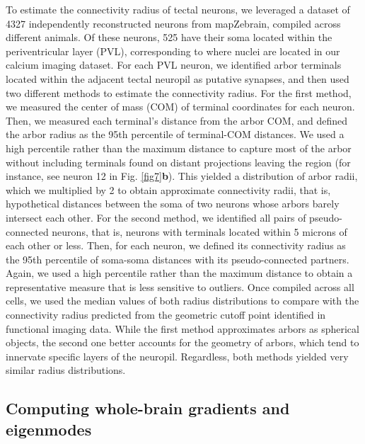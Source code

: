 \documentclass{article}
\begin{document}
To estimate the connectivity radius of tectal neurons, we leveraged a dataset of 4327 independently reconstructed neurons from mapZebrain, compiled across different animals\cite{kunst2019cellular}. Of these neurons, 525 have their soma located within the periventricular layer (PVL), corresponding to where nuclei are located in our calcium imaging dataset. For each PVL neuron, we identified arbor terminals located within the adjacent tectal neuropil as putative synapses, and then used two different methods to estimate the connectivity radius. For the first method, we measured the center of mass (COM) of terminal coordinates for each neuron. Then, we measured each terminal's distance from the arbor COM, and defined the arbor radius as the 95th percentile of terminal-COM distances. We used a high percentile rather than the maximum distance to capture most of the arbor without including terminals found on distant projections leaving the region (for instance, see neuron 12 in Fig. \ref{fig7}\textbf{b}). This yielded a distribution of arbor radii, which we multiplied by 2 to obtain approximate connectivity radii, that is, hypothetical distances between the soma of two neurons whose arbors barely intersect each other. For the second method, we identified all pairs of pseudo-connected neurons, that is, neurons with terminals located within 5 microns of each other or less. Then, for each neuron, we defined its connectivity radius as the 95th percentile of soma-soma distances with its pseudo-connected partners. Again, we used a high percentile rather than the maximum distance to obtain a representative measure that is less sensitive to outliers. Once compiled across all cells, we used the median values of both radius distributions to compare with the connectivity radius predicted from the geometric cutoff point identified in functional imaging data. While the first method approximates arbors as spherical objects, the second one better accounts for the geometry of arbors, which tend to innervate specific layers of the neuropil. Regardless, both methods yielded very similar radius distributions.

\subsection*{Computing whole-brain gradients and eigenmodes}
\end{document}
